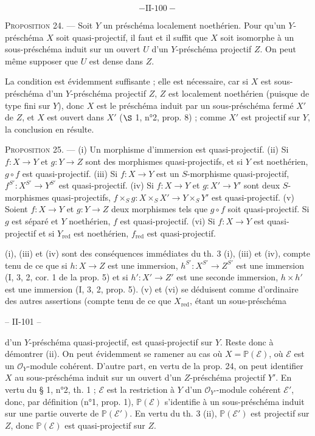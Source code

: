 \newpage



$$- \text{II-}100 -$$

\textsc{Proposition} 24. — Soit $Y$ un préschéma localement noethérien. Pour qu'un $Y$-préschéma $X$ soit quasi-projectif, il faut et il suffit que $X$ soit isomorphe à un sous-préschéma induit sur un ouvert $U$ d'un $Y$-préschéma projectif $Z$. On peut même supposer que $U$ est dense dans $Z$.

La condition est évidemment suffisante ; elle est nécessaire, car si $X$ est sous-préschéma d'un $Y$-préschéma projectif $Z$, $Z$ est localement noethérien (puisque de type fini sur $Y$), donc $X$ est le préschéma induit par un sous-préschéma fermé $X'$ de $Z$, et $X$ est ouvert dans $X'$ ($\S$ 1, n°2, prop. 8) ; comme $X'$ est projectif sur $Y$, la conclusion en résulte.

\textsc{Proposition} 25. — (i) Un morphisme d'immersion est quasi-projectif.
(ii) Si $f: X \to Y$ et $g: Y \to Z$ sont des morphismes quasi-projectifs, et si $Y$ est noethérien, $g \circ f$ est quasi-projectif.
(iii) Si $f: X \to Y$ est un $S$-morphisme quasi-projectif, $f^{S'}: X^{S'} \to Y^{S'}$ est quasi-projectif.
(iv) Si $f: X \to Y$ et $g: X' \to Y'$ sont deux $S$-morphismes quasi-projectifs, $f \times_S g : X \times_S X' \to Y \times_S Y'$ est quasi-projectif.
(v) Soient $f: X \to Y$ et $g: Y \to Z$ deux morphismes tels que $g \circ f$ soit quasi-projectif. Si $g$ est séparé et $Y$ noethérien, $f$ est quasi-projectif.
(vi) Si $f: X \to Y$ est quasi-projectif et si $Y_{\text{red}}$ est noethérien, $f_{\text{red}}$ est quasi-projectif.

(i), (iii) et (iv) sont des conséquences immédiates du th. 3 (i), (iii) et (iv), compte tenu de ce que si $h: X \to Z$ est une immersion, $h^{S'}: X^{S'} \to Z^{S'}$ est une immersion (I, 3, 2, cor. 1 de la prop. 5) et si $h': X' \to Z'$ est une seconde immersion, $h \times h'$ est une immersion (I, 3, 2, prop. 5). (v) et (vi) se déduisent comme d'ordinaire des autres assertions (compte tenu de ce que $X_{\text{red}}$, étant un sous-préschéma

\newpage


\noindent -- II-101 --

d'un $Y$-préschéma quasi-projectif, est quasi-projectif sur $Y$. Reste donc à démontrer (ii). On peut évidemment se ramener au cas où $X = \mathbb{P}(\mathcal{E})$, où $\mathcal{E}$ est un $\mathcal{O}_Y$-module cohérent. D'autre part, en vertu de la prop. 24, on peut identifier $X$ au sous-préschéma induit sur un ouvert d'un $Z$-préschéma projectif $Y'$. En vertu du § 1, n°2, th. 1 ; $\mathcal{E}$ est la restriction à $Y$ d'un $\mathcal{O}_{Y'}$-module cohérent $\mathcal{E}'$, donc, par définition (n°1, prop. 1), $\mathbb{P}(\mathcal{E})$ s'identifie à un sous-préschéma induit sur une partie ouverte de $\mathbb{P}(\mathcal{E}')$. En vertu du th. 3 (ii), $\mathbb{P}(\mathcal{E}')$ est projectif sur $Z$, donc $\mathbb{P}(\mathcal{E})$ est quasi-projectif sur $Z$.

